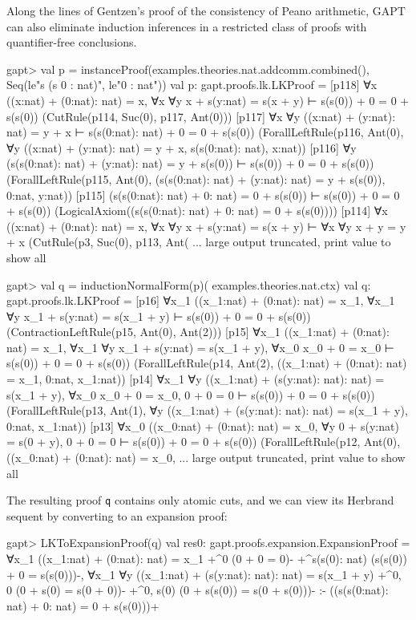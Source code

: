 \documentclass[a4paper,11pt]{book}
\begin{document}
Along the lines of Gentzen's proof of the consistency of Peano arithmetic,
GAPT can also eliminate induction inferences in a restricted class of proofs
with quantifier-free conclusions.

\begin{clilisting}
gapt> val p = instanceProof(examples.theories.nat.addcomm.combined(),                                     Seq(le"s (s 0 : nat)", le"0 : nat"))
val p: gapt.proofs.lk.LKProof = [p118] ∀x ((x:nat) + (0:nat): nat) = x,
∀x ∀y x + s(y:nat) = s(x + y)
⊢
s(s(0)) + 0 = 0 + s(s(0))    (CutRule(p114, Suc(0), p117, Ant(0)))
[p117] ∀x ∀y ((x:nat) + (y:nat): nat) = y + x ⊢ s(s(0:nat): nat) + 0 = 0 + s(s(0))    (ForallLeftRule(p116, Ant(0), ∀y ((x:nat) + (y:nat): nat) = y + x, s(s(0:nat): nat), x:nat))
[p116] ∀y (s(s(0:nat): nat) + (y:nat): nat) = y + s(s(0)) ⊢ s(s(0)) + 0 = 0 + s(s(0))    (ForallLeftRule(p115, Ant(0), (s(s(0:nat): nat) + (y:nat): nat) = y + s(s(0)), 0:nat, y:nat))
[p115] (s(s(0:nat): nat) + 0: nat) = 0 + s(s(0)) ⊢ s(s(0)) + 0 = 0 + s(s(0))    (LogicalAxiom((s(s(0:nat): nat) + 0: nat) = 0 + s(s(0))))
[p114] ∀x ((x:nat) + (0:nat): nat) = x,
∀x ∀y x + s(y:nat) = s(x + y)
⊢
∀x ∀y x + y = y + x    (CutRule(p3, Suc(0), p113, Ant( ... large output truncated, print value to show all

gapt> val q = inductionNormalForm(p)(                                         examples.theories.nat.ctx)
val q: gapt.proofs.lk.LKProof = [p16] ∀x_1 ((x_1:nat) + (0:nat): nat) = x_1,
∀x_1 ∀y x_1 + s(y:nat) = s(x_1 + y)
⊢
s(s(0)) + 0 = 0 + s(s(0))    (ContractionLeftRule(p15, Ant(0), Ant(2)))
[p15] ∀x_1 ((x_1:nat) + (0:nat): nat) = x_1,
∀x_1 ∀y x_1 + s(y:nat) = s(x_1 + y),
∀x_0 x_0 + 0 = x_0
⊢
s(s(0)) + 0 = 0 + s(s(0))    (ForallLeftRule(p14, Ant(2), ((x_1:nat) + (0:nat): nat) = x_1, 0:nat, x_1:nat))
[p14] ∀x_1 ∀y ((x_1:nat) + (s(y:nat): nat): nat) = s(x_1 + y),
∀x_0 x_0 + 0 = x_0,
0 + 0 = 0
⊢
s(s(0)) + 0 = 0 + s(s(0))    (ForallLeftRule(p13, Ant(1), ∀y ((x_1:nat) + (s(y:nat): nat): nat) = s(x_1 + y), 0:nat, x_1:nat))
[p13] ∀x_0 ((x_0:nat) + (0:nat): nat) = x_0,
∀y 0 + s(y:nat) = s(0 + y),
0 + 0 = 0
⊢
s(s(0)) + 0 = 0 + s(s(0))    (ForallLeftRule(p12, Ant(0), ((x_0:nat) + (0:nat): nat) = x_0, ... large output truncated, print value to show all

\end{clilisting}

The resulting proof \texttt{q} contains only atomic cuts, and we can view its Herbrand
sequent by converting to an expansion proof:

\begin{clilisting}
gapt> LKToExpansionProof(q)
val res0: gapt.proofs.expansion.ExpansionProof = ∀x_1 ((x_1:nat) + (0:nat): nat) = x_1
  +^{0} (0 + 0 = 0)-
  +^{s(s(0): nat)} (s(s(0)) + 0 = s(s(0)))-,
∀x_1 ∀y ((x_1:nat) + (s(y:nat): nat): nat) = s(x_1 + y)
  +^{0, 0} (0 + s(0) = s(0 + 0))-
  +^{0, s(0)} (0 + s(s(0)) = s(0 + s(0)))-
:-
((s(s(0:nat): nat) + 0: nat) = 0 + s(s(0)))+

\end{clilisting}
\end{document}
